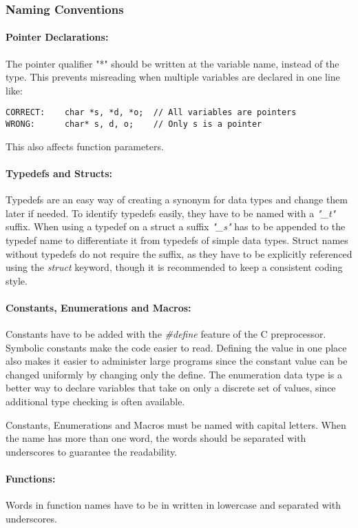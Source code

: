 \subsubsection{Naming Conventions}

\paragraph{Pointer Declarations:}
The pointer qualifier "*" should be written at the variable name, instead of the type.
This prevents misreading when multiple variables are declared in one line like:
\begin{verbatim}
CORRECT:    char *s, *d, *o;  // All variables are pointers
WRONG:      char* s, d, o;    // Only s is a pointer
\end{verbatim}
This also affects function parameters.


\paragraph{Typedefs and Structs:}

Typedefs are an easy way of creating a synonym for data types and change them later if needed.
To identify typedefs easily, they have to be named with a \textit{"\_t"} suffix.
When using a typedef on a struct a suffix \textit{"\_s"} has to be appended to the typedef name to differentiate it from typedefs of simple data types.
Struct names without typedefs do not require the suffix, as they have to be explicitly referenced using the \textit{struct} keyword, though it is recommended to keep a consistent coding style.


\paragraph{Constants, Enumerations and Macros:}

Constants have to be added with the \textit{\#define} feature of the C preprocessor.
Symbolic constants make the code easier to read.
Defining the value in one place also makes it easier to administer large programs since the constant value can be changed uniformly by changing only the define.
The enumeration data type is a better way to declare variables that take on only a discrete set of values, since additional type checking is often available. 

Constants, Enumerations and Macros must be named with capital letters.
When the name has more than one word, the words should be separated with underscores to guarantee the readability.

\paragraph{Functions:} Words in function names have to be in written in lowercase and separated with underscores. 

